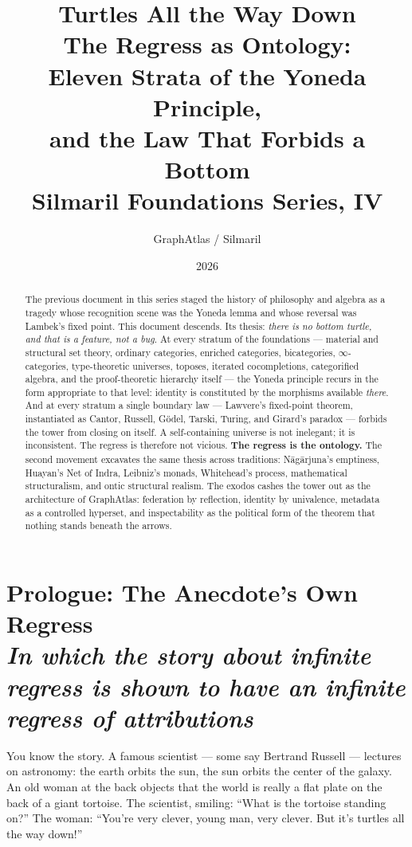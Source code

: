 \documentclass[11pt]{article}
\title{\color{silmaril}\textbf{Turtles All the Way Down}\\[0.6ex]
\large The Regress as Ontology:\\ Eleven Strata of the Yoneda Principle,\\ and the Law That Forbids a Bottom\\[0.4ex]
\normalsize Silmaril Foundations Series, IV}
\author{GraphAtlas / Silmaril}
\date{2026}
\theoremstyle{plain}
\theoremstyle{definition}
\theoremstyle{remark}
\newcommand{\stratum}[2]{\section{#1 \\ {\normalsize\normalfont\itshape #2}}}
\begin{document}
\maketitle

\begin{abstract}
\noindent The previous document in this series staged the history of philosophy and algebra as a tragedy whose recognition scene was the Yoneda lemma and whose reversal was Lambek's fixed point. This document descends. Its thesis: \emph{there is no bottom turtle, and that is a feature, not a bug}. At every stratum of the foundations --- material and structural set theory, ordinary categories, enriched categories, bicategories, $\infty$-categories, type-theoretic universes, toposes, iterated cocompletions, categorified algebra, and the proof-theoretic hierarchy itself --- the Yoneda principle recurs in the form appropriate to that level: identity is constituted by the morphisms available \emph{there}. And at every stratum a single boundary law --- Lawvere's fixed-point theorem, instantiated as Cantor, Russell, G\"odel, Tarski, Turing, and Girard's paradox --- forbids the tower from closing on itself. A self-containing universe is not inelegant; it is inconsistent. The regress is therefore not vicious. \textbf{The regress is the ontology.} The second movement excavates the same thesis across traditions: N\=ag\=arjuna's emptiness, Huayan's Net of Indra, Leibniz's monads, Whitehead's process, mathematical structuralism, and ontic structural realism. The exodos cashes the tower out as the architecture of GraphAtlas: federation by reflection, identity by univalence, metadata as a controlled hyperset, and inspectability as the political form of the theorem that nothing stands beneath the arrows.
\end{abstract}

\tableofcontents
\newpage

\stratum{Prologue: The Anecdote's Own Regress}{In which the story about infinite regress is shown to have an infinite regress of attributions}

You know the story. A famous scientist --- some say Bertrand Russell --- lectures on astronomy: the earth orbits the sun, the sun orbits the center of the galaxy. An old woman at the back objects that the world is really a flat plate on the back of a giant tortoise. The scientist, smiling: ``What is the tortoise standing on?'' The woman: ``You're very clever, young man, very clever. But it's turtles all the way down!''
\end{document}
